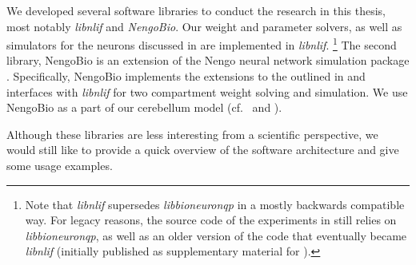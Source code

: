 
We developed several software libraries to conduct the research in this thesis, most notably \emph{libnlif} and \emph{NengoBio}.
Our weight and parameter solvers, as well as simulators for the \nlif neurons discussed in  are implemented in \emph{libnlif}.%
\footnote{
Note that \emph{libnlif} supersedes \emph{libbioneuronqp} in a mostly backwards compatible way.
For legacy reasons, the source code of the experiments in  still relies on \emph{libbioneuronqp}, as well as an older version of the code that eventually became \emph{libnlif} (initially published as supplementary material for \cite{stoeckel2021}).
}
The second library, NengoBio is an extension of the Nengo neural network simulation package \citep{bekolay2014nengo}.
Specifically, NengoBio implements the extensions to the \NEF outlined in  and interfaces with \emph{libnlif} for two compartment weight solving and simulation.
We use NengoBio as a part of our cerebellum model (cf.~ and \cite{stockel2021connecting}).

Although these libraries are less interesting from a scientific perspective, we would still like to provide a quick overview of the software architecture and give some usage examples.